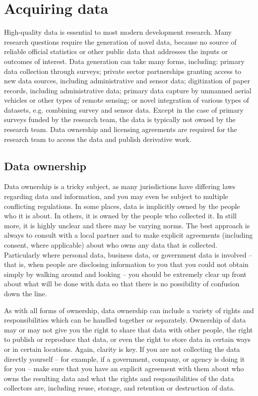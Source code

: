 \section{Acquiring data}

High-quality data is essential to most modern development research.
Many research questions require the generation of novel data, 
because no source of reliable official statistics
or other public data that addresses the inputs or outcomes of interest.
Data generation can take many forms, including: 
primary data collection through surveys; 
private sector partnerships granting access to new data sources, including administrative and sensor data;
digitization of paper records, including administrative data;
primary data capture by unmanned aerial vehicles or other types of remote sensing;
or novel integration of various types of datasets, e.g. combining survey and sensor data.
Except in the case of primary surveys funded by the research team, 
the data is typically not owned by the research team. 
Data ownership and licensing agreements are required 
for the research team to access the data and publish derivative work. 


\subsection{Data ownership}

Data ownership is a tricky subject,
as many jurisdictions have differing laws regarding data and information,
and you may even be subject to multiple conflicting regulations.
In some places, data is implicitly owned by the people who it is about.
In others, it is owned by the people who collected it.
In still more, it is highly unclear and there may be varying norms.
The best approach is always to consult with a local partner
and to make explicit agreements (including consent, where applicable)
about who owns any data that is collected.
Particularly where personal data, business data, or government data is involved
-- that is, when people are disclosing information to you
that you could not obtain simply by walking around and looking --
you should be extremely clear up front about what will be done with data
so that there is no possibility of confusion down the line.

As with all forms of ownership,
data ownership can include a variety of rights and responsibilities
which can be handled together or separately.
Ownership of data may or may not give you
the right to share that data with other people,
the right to publish or reproduce that data,
or even the right to store data in certain ways or in certain locations.
Again, clarity is key.
If you are not collecting the data directly yourself --
for example, if a government, company, or agency is doing it for you --
make sure that you have an explicit agreement with them
about who owns the resulting data
and what the rights and responsibilities of the data collectors are,
including reuse, storage, and retention or destruction of data.


